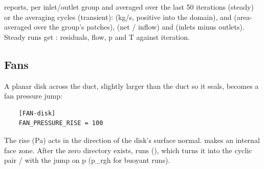  reports, per inlet/outlet group and averaged over the last 50 iterations (steady) or the averaging cycles (transient):  (kg/s, positive into the domain),  and  (area-averaged over the group's patches),  (net / inflow) and  (inlets minus outlets). Steady runs get : residuals, flow, p and T against iteration.

\subsection{Fans}
A  planar disk across the duct, slightly larger than the duct so it seals, becomes a fan pressure jump:
\begin{lstlisting}
    [FAN-disk]
    FAN_PRESSURE_RISE = 100
\end{lstlisting}
The rise (Pa) acts in the direction of the disk's surface normal.  makes an internal face zone. After the zero directory exists,  runs  (), which turns it into the cyclic pair  /  with the  jump on p (p\_rgh for buoyant runs).

